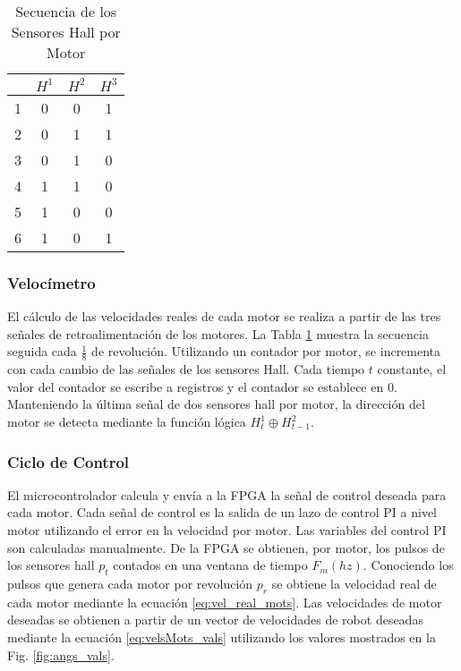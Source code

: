 \begin{table}
\centering
\caption{Secuencia de los Sensores Hall por Motor}
\begin{tabular}{l|c c c }

 & $H^1$ & $H^2$ & $H^3$  \\
\hline
1   & 0 & 0 & 1\\
2   & 0 & 1 & 1\\
3   & 0 & 1 & 0\\
4   & 1 & 1 & 0\\
5   & 1 & 0 & 0\\
6   & 1 & 0 & 1\\
\end{tabular}
\label{table:hall_seq}
\end{table} 

\subsubsection{Velocímetro}
El cálculo de las velocidades reales de cada motor se realiza a partir de las tres señales de retroalimentación de los motores. La Tabla \ref{table:hall_seq} muestra la secuencia seguida cada $ \frac{1}{8} $ de revolución. Utilizando un contador por motor, se incrementa con cada cambio de las señales de los sensores Hall. Cada tiempo $t$ constante, el valor del contador se escribe a registros y el contador se establece en 0. Manteniendo la última señal de dos sensores hall por motor, la dirección del motor se detecta mediante la función lógica $ H_{t}^1 \oplus H_{t-1}^2 $.






\subsubsection{Ciclo de Control}



El microcontrolador calcula y envía a la \gls{FPGA} la señal de control deseada para cada motor. Cada señal de control es la salida de un lazo de control PI a nivel motor  utilizando el error en la velocidad por motor. Las variables del control PI son calculadas manualmente. De la FPGA se obtienen, por motor, los pulsos de los sensores hall $p_t$ contados en una ventana de tiempo $F_m (hz)$. Conociendo los pulsos que genera cada motor por revolución $p_r$ se obtiene la velocidad real de cada motor mediante la ecuación \eqref{eq:vel_real_mots}. Las velocidades de motor deseadas se obtienen a partir de un vector de velocidades de robot deseadas mediante la ecuación \eqref{eq:velsMots_vals} utilizando los valores mostrados en la Fig. \ref{fig:angs_vals}.

